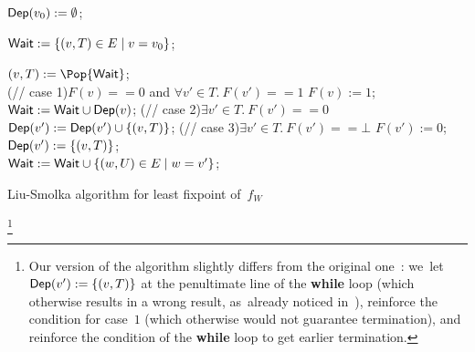 \begin{algorithm}
  \SetAlgoNoEnd

  
  $\textsf{Dep}(v_0):=\emptyset$;

  $\textsf{Wait}:=\{(v,T)\in E \mid v=v_0\}$;

        {$(v,T):=\Pop{\Wait}$;\\
          \If(\hfill{// case 1}){$F(v)==0$ and $\forall v'\in T.\ F(v')==1$}
             {$F(v):=1$;\\
              $\textsf{Wait}:=\textsf{Wait}\cup\textsf{Dep}(v)$;}
          \ElseIf(\hfill{// case 2}){$\exists v'\in T.\ F(v')==0$}
                {$\textsf{Dep}(v'):=\textsf{Dep}(v') \cup \{(v,T)\}$;}
                \ElseIf(\hfill{// case 3}){$\exists v'\in T.\ F(v')==\bot$}
                  {$F(v'):=0$; \\
                  $\textsf{Dep}(v'):=\{(v,T)\}$;\\
                  $\textsf{Wait}:=\textsf{Wait}\cup\{(w,U)\in E \mid w=v'\}$;
                  }
                  }
  \caption{Liu-Smolka algorithm for least fixpoint of~$f_W$}
  \label{9-algo:LS98}
\end{algorithm}

\footnote{Our version of the algorithm slightly differs from the
  original one~\cite{LS98}: we~let $\textsf{Dep}(v'):=\{(v,T)\}$ at the penultimate line
  of the \textbf{while} loop (which otherwise results in a wrong
  result, as~already noticed in~\cite{JLSO13}), reinforce the
  condition for case~$1$ (which otherwise would not guarantee
  termination), and reinforce the condition of the \textbf{while} loop
  to get earlier termination.}

